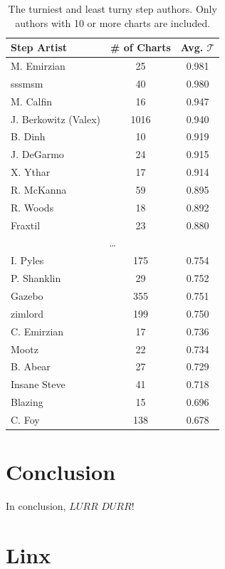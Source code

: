 \documentclass[10pt]{sigplanconf}
\begin{document}
\begin{table}[t]
	\begin{center}
		\small
	\begin{tabular}{l|c|c}
		Step Artist & \# of Charts & Avg. $\mathcal{T}$ \\
		\hline
		M. Emirzian & 25 & 0.981 \\
		sssmsm & 40 & 0.980 \\
		M. Calfin & 16 & 0.947 \\
		J. Berkowitz (Valex) & 1016 & 0.940 \\
		B. Dinh & 10 & 0.919 \\
		J. DeGarmo & 24 & 0.915 \\
		X. Ythar & 17 & 0.914 \\
		R. McKanna & 59 & 0.895 \\
		R. Woods & 18 & 0.892 \\
		Fraxtil & 23 & 0.880 \\
		\multicolumn{3}{c}{\normalsize\dots} \\
		I. Pyles & 175 & 0.754 \\
		P. Shanklin & 29 & 0.752 \\
		Gazebo & 355 & 0.751 \\
		zimlord & 199 & 0.750 \\
		C. Emirzian & 17 & 0.736 \\
		Mootz & 22 & 0.734 \\
		B. Abear & 27 & 0.729 \\
		Insane Steve & 41 & 0.718 \\
		Blazing & 15 & 0.696 \\
		C. Foy & 138 & 0.678 \\
	\end{tabular}
	\end{center}
	\caption{The turniest and least turny step authors. Only authors with 10 or more charts are included.}
	\label{tab:artist}
\end{table}


\section{Conclusion}


In conclusion, $LURR$ $DURR$!


\appendix

\section{Linx}
\end{document}
